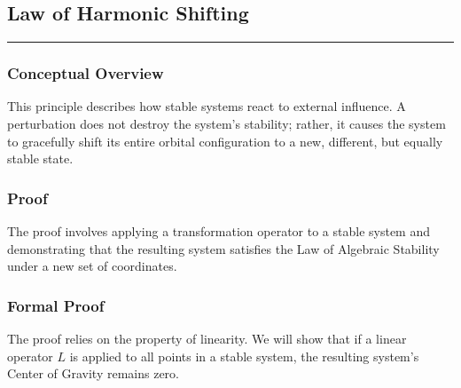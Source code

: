 \subsection*{Law of Harmonic Shifting}
\hrule
\vspace{0.3cm}
\vspace{0.5cm}

\subsubsection*{Conceptual Overview}
This principle describes how stable systems react to external influence.  A perturbation does not destroy the system's stability; rather, it causes the system to gracefully shift its entire orbital configuration to a new, different, but equally stable state. 

\subsubsection*{Proof}
The proof involves applying a transformation operator to a stable system and demonstrating that the resulting system satisfies the Law of Algebraic Stability under a new set of coordinates. 

\subsubsection*{Formal Proof}
The proof relies on the property of linearity. We will show that if a linear operator $L$ is applied to all points in a stable system, the resulting system's Center of Gravity remains zero.

